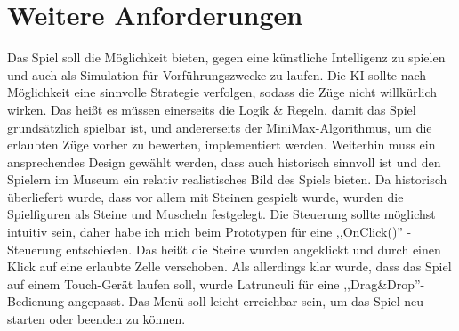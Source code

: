 \section{Weitere Anforderungen}
\label{ch:Analyse:sec:Anforderungen}
Das Spiel soll die Möglichkeit bieten, gegen eine künstliche Intelligenz zu spielen und auch als Simulation für Vorführungszwecke zu laufen. Die KI sollte nach Möglichkeit eine sinnvolle Strategie verfolgen, sodass die Züge nicht willkürlich wirken. Das heißt es müssen einerseits die Logik \& Regeln, damit das Spiel grundsätzlich spielbar ist, und andererseits der MiniMax-Algorithmus, um die erlaubten Züge vorher zu bewerten,  implementiert werden. Weiterhin muss ein ansprechendes Design gewählt werden, dass auch historisch sinnvoll ist und den Spielern im Museum ein relativ realistisches Bild des Spiels bieten. Da historisch überliefert wurde, dass vor allem mit Steinen gespielt wurde, wurden die Spielfiguren als Steine und Muscheln festgelegt. Die Steuerung sollte möglichst intuitiv sein, daher habe ich mich beim Prototypen für eine ,,OnClick()'' -Steuerung entschieden. Das heißt die Steine wurden angeklickt und durch einen Klick auf eine erlaubte Zelle verschoben. Als allerdings klar wurde, dass das Spiel auf einem Touch-Gerät laufen soll, wurde Latrunculi für eine ,,Drag\&Drop''-Bedienung angepasst. Das Menü soll leicht erreichbar sein, um das Spiel neu starten oder beenden zu können.






